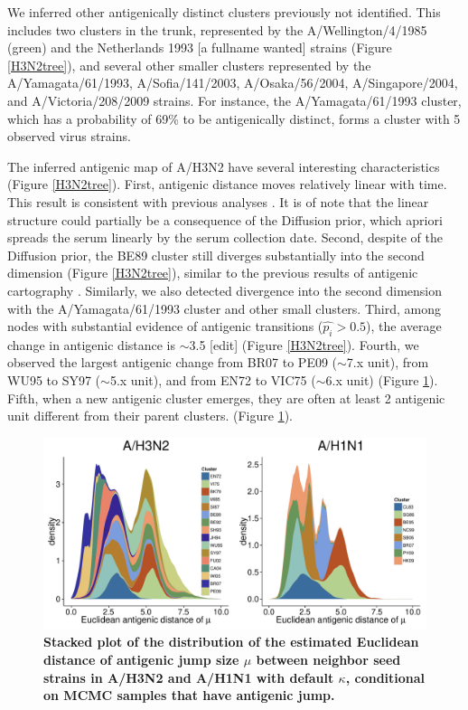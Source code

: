 \documentclass[11pt,oneside,letterpaper]{article}
\begin{document}
We inferred other antigenically distinct clusters previously not identified. %
This includes two clusters in the trunk, represented by the A/Wellington/4/1985 (green) and the Netherlands 1993 [a fullname wanted] strains (Figure \ref{H3N2tree}), and several other smaller clusters represented by the A/Yamagata/61/1993, A/Sofia/141/2003, A/Osaka/56/2004,  A/Singapore/2004, and A/Victoria/208/2009 strains. 
For instance, the A/Yamagata/61/1993 cluster, which has a probability of 69\% to be antigenically distinct, forms a cluster with 5 observed virus strains. 


The inferred antigenic map of A/H3N2 have several interesting characteristics (Figure \ref{H3N2tree}). 
First, antigenic distance moves relatively linear with time.  
This result is consistent with previous analyses \cite{smith_mapping_2004, bedford_integrating_2014}.
It is of note that the linear structure could partially be a consequence of the Diffusion prior, which apriori spreads the serum linearly by the serum collection date. 
Second, despite of the Diffusion prior, the BE89 cluster still diverges substantially into the second dimension (Figure \ref{H3N2tree}), similar to the previous results of antigenic cartography \cite{smith_mapping_2004, bedford_integrating_2014}. 
Similarly, we also detected divergence into the second dimension with the A/Yamagata/61/1993 cluster and other small clusters. 
Third, among nodes with substantial evidence of antigenic transitions ($\hat{p_i} > 0.5$), the average change in antigenic distance is $\sim$3.5 [edit] (Figure \ref{H3N2tree}). 
Fourth, we observed the largest antigenic change from BR07 to PE09 ($\sim$7.x unit), from WU95 to SY97 ($\sim$5.x unit), and from EN72 to VIC75 ($\sim$6.x unit) (Figure \ref{stackedMuPlot}).
Fifth, when a new antigenic cluster emerges, they are often at least 2 antigenic unit different  from their parent clusters.  (Figure \ref{stackedMuPlot}). 


\begin{figure}[h]
	\centering		
	\includegraphics[width=1\textwidth]{figures/custom/mu-seed-stacked-h3n2-0_1-h1n1-0_3}
	\caption{\textbf{Stacked plot of the distribution of the estimated Euclidean distance of antigenic jump size $\mu$ between neighbor seed strains in A/H3N2 and A/H1N1 with default $\kappa$, conditional on MCMC samples that have antigenic jump.}
	} 
	\label{stackedMuPlot} 
\end{figure}
\end{document}
